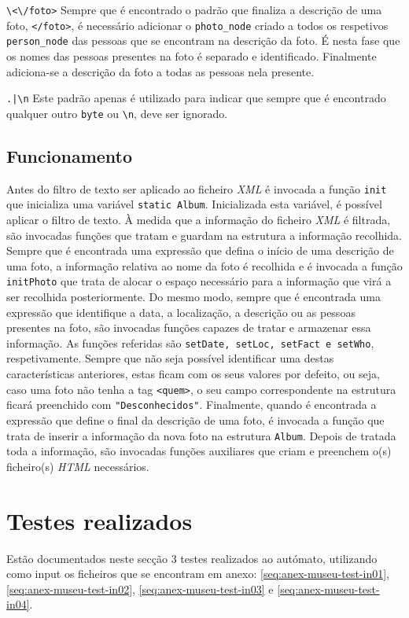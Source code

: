 \verb!\<\/foto>!
Sempre que é encontrado o padrão que finaliza a descrição de uma foto, \verb!</foto>!, é necessário adicionar o \verb!photo_node! criado a todos os respetivos \verb!person_node! das pessoas que se encontram na descrição da foto. É nesta fase que os nomes das pessoas presentes na foto é separado e identificado. Finalmente adiciona-se a descrição da foto a todas as pessoas nela presente.

\verb!.|\n!
Este padrão apenas é utilizado para indicar que sempre que é encontrado qualquer outro \verb!byte! ou \verb!\n!, deve ser ignorado.

\subsection{Funcionamento}
\label{seq:museu-func}
Antes do filtro de texto ser aplicado ao ficheiro \emph{XML} é invocada a função \verb!init! que inicializa uma variável \verb!static Album!. Inicializada esta variável, é possível aplicar o filtro de texto.
À medida que a informação do ficheiro \emph{XML} é filtrada, são invocadas funções que tratam e guardam na estrutura a informação recolhida.
Sempre que é encontrada uma expressão que defina o início de uma descrição de uma foto, a informação relativa ao nome da foto é recolhida e é invocada a função \verb!initPhoto! que trata de alocar o espaço necessário para a informação que virá a ser recolhida posteriormente. Do mesmo modo, sempre que é encontrada uma expressão que identifique a data, a localização, a descrição ou as pessoas presentes na foto, são invocadas funções capazes de tratar e armazenar essa informação. As funções referidas são \verb!setDate, setLoc, setFact e setWho!, respetivamente. Sempre que não seja possível identificar uma destas características anteriores, estas ficam com os seus valores por defeito, ou seja, caso uma foto não tenha a tag \verb!<quem>!, o seu campo correspondente na estrutura ficará preenchido com \verb!"Desconhecidos"!. Finalmente, quando é encontrada a expressão que define o final da descrição de uma foto, é invocada a função que trata de inserir a informação da nova foto na estrutura \verb!Album!.
Depois de tratada toda a informação, são invocadas funções auxiliares que criam e preenchem o(s) ficheiro(s) \emph{HTML} necessários.

\section{Testes realizados}
\label{seq:museu-test}
Estão documentados neste secção 3 testes realizados ao autómato, utilizando como input os ficheiros que se encontram em anexo: \ref{seq:anex-museu-test-in01}, \ref{seq:anex-museu-test-in02}, \ref{seq:anex-museu-test-in03} e \ref{seq:anex-museu-test-in04}.

